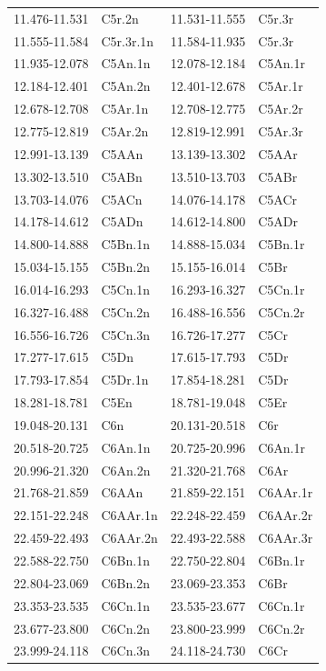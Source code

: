 \begin{center}
\begin{longtable}{ll|ll}
11.476-11.531 & C5r.2n & 11.531-11.555 & C5r.3r\\
11.555-11.584 & C5r.3r.1n & 11.584-11.935 & C5r.3r\\
11.935-12.078 & C5An.1n & 12.078-12.184 & C5An.1r\\
12.184-12.401 & C5An.2n & 12.401-12.678 & C5Ar.1r\\
12.678-12.708 & C5Ar.1n & 12.708-12.775 & C5Ar.2r\\
12.775-12.819 & C5Ar.2n & 12.819-12.991 & C5Ar.3r\\
12.991-13.139 & C5AAn & 13.139-13.302 & C5AAr\\
13.302-13.510 & C5ABn & 13.510-13.703 & C5ABr\\
13.703-14.076 & C5ACn & 14.076-14.178 & C5ACr\\
14.178-14.612 & C5ADn & 14.612-14.800 & C5ADr\\
14.800-14.888 & C5Bn.1n & 14.888-15.034 & C5Bn.1r\\
15.034-15.155 & C5Bn.2n & 15.155-16.014 & C5Br\\
16.014-16.293 & C5Cn.1n & 16.293-16.327 & C5Cn.1r\\
16.327-16.488 & C5Cn.2n & 16.488-16.556 & C5Cn.2r\\
16.556-16.726 & C5Cn.3n & 16.726-17.277 & C5Cr\\
17.277-17.615 & C5Dn & 17.615-17.793 & C5Dr\\
17.793-17.854 & C5Dr.1n & 17.854-18.281 & C5Dr\\
18.281-18.781 & C5En & 18.781-19.048 & C5Er\\
19.048-20.131 & C6n & 20.131-20.518 & C6r\\
20.518-20.725 & C6An.1n & 20.725-20.996 & C6An.1r\\
20.996-21.320 & C6An.2n &  21.320-21.768 & C6Ar\\
21.768-21.859 & C6AAn & 21.859-22.151 & C6AAr.1r\\
22.151-22.248 & C6AAr.1n & 22.248-22.459 & C6AAr.2r\\
22.459-22.493 & C6AAr.2n & 22.493-22.588 & C6AAr.3r\\
22.588-22.750 & C6Bn.1n & 22.750-22.804 & C6Bn.1r\\
22.804-23.069 & C6Bn.2n & 23.069-23.353 & C6Br\\
23.353-23.535 & C6Cn.1n & 23.535-23.677 & C6Cn.1r\\
23.677-23.800 & C6Cn.2n & 23.800-23.999 & C6Cn.2r\\
23.999-24.118 & C6Cn.3n & 24.118-24.730 & C6Cr\\

\end{longtable}
\end{center}
